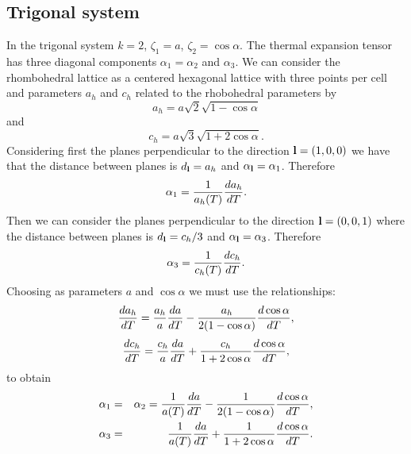 \documentclass[12pt,a4paper]{article}
\begin{document}
\subsection{\color{web-blue}Trigonal system}
In the trigonal system $k=2$, $\zeta_1=a$, $\zeta_2=\cos\alpha$. 
The thermal expansion tensor has three diagonal components 
$\alpha_1=\alpha_2$ and $\alpha_3$. We can consider the rhombohedral
lattice as a centered hexagonal lattice with three points per cell
and parameters $a_h$ and $c_h$ related to the rhobohedral parameters
by
\begin{equation}
a_h= a \sqrt{2} \sqrt{1-\cos\alpha}
\end{equation}
and 
\begin{equation}
c_h= a \sqrt{3} \sqrt{1+2\cos\alpha}.
\end{equation}
Considering first the planes perpendicular to the direction
${\bf l}=(1,0,0)$ we have that the distance between planes is
$d_{\bf l}=a_h$ and $\alpha_{\bf l}=\alpha_1$. Therefore
\begin{equation}
\alpha_1 = {1\over a_h(T)} {d a_h \over dT}.
\end{equation}
Then we can consider the planes perpendicular to the direction
${\bf l}=(0,0,1)$ where the distance between planes is
$d_{\bf l}=c_h/3$ and $\alpha_{\bf l}=\alpha_3$. Therefore
\begin{equation}
\alpha_3 = {1\over c_h(T)} {dc_h \over d T}.
\end{equation}
Choosing as parameters $a$ and $\cos \alpha$ we must use the relationships:
\begin{equation}
{d a_h \over d T}= {a_h \over a} {d a \over d T} - {a_h \over 2(1-\cos\alpha)}{d \cos\alpha \over d T},
\end{equation}
\begin{equation}
{d c_h \over d T}= {c_h \over a} {d a \over d T} + {c_h \over 1+2\cos\alpha}{d \cos\alpha \over d T},
\end{equation}
to obtain
\begin{eqnarray}
\alpha_1 &=& \alpha_2= {1\over a(T)} {d a \over dT} - {1 \over 2(1-\cos\alpha)}{d \cos\alpha \over d T}, \\
\alpha_3 &=& {1\over a(T)} {d a \over dT} + {1 \over 1+2\cos\alpha}
{d \cos\alpha \over d T}.
\end{eqnarray}
\end{document}
